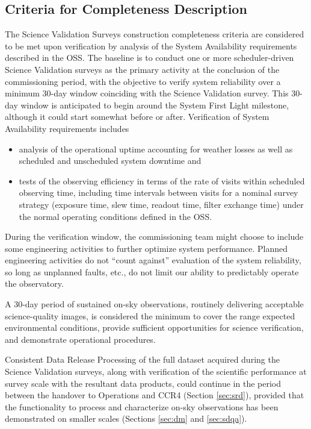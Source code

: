 \subsection{Criteria for Completeness Description}

The Science Validation Surveys construction completeness criteria are considered to be met upon verification by analysis of the System Availability requirements described in the OSS.
The baseline is to conduct one or more scheduler-driven Science Validation surveys as the primary activity at the conclusion of the commissioning period, with the objective to verify system reliability over a minimum 30-day window coinciding with the Science Validation survey. This 30-day window is anticipated to begin around the System First Light milestone, although it could start somewhat before or after.
Verification of System Availability requirements includes

\begin{itemize}
        \item analysis of the operational uptime accounting for weather losses as well as scheduled and unscheduled system downtime and
        \item tests of the observing efficiency in terms of the rate of visits within scheduled observing time, including time intervals between visits for a nominal survey strategy (exposure time, slew time, readout time, filter exchange time) under the normal operating conditions defined in the OSS.
\end{itemize}

During the verification window, the commissioning team might choose to include some engineering activities to further optimize system performance. Planned engineering activities do not ``count against'' evaluation of the system reliability, so long as unplanned faults, etc., do not limit our ability to predictably operate the observatory.

A 30-day period of sustained on-sky observations, routinely delivering acceptable science-quality images, is considered the minimum to cover the range expected environmental conditions, provide sufficient opportunities for science verification, and demonstrate operational procedures.

Consistent Data Release Processing of the full dataset acquired during the Science Validation surveys, along with verification of the scientific performance at survey scale with the resultant data products, could continue in the period between the handover to Operations and CCR4 (Section \ref{sec:srd}), provided that the functionality to process and characterize on-sky observations has been demonstrated on smaller scales (Sections \ref{sec:dm} and \ref{sec:sdqa}).

